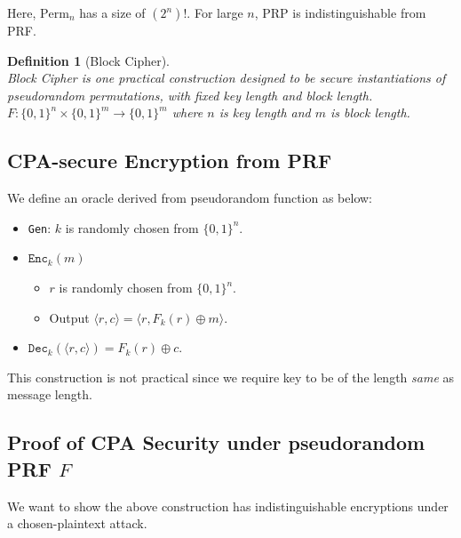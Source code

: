 \documentclass[12pt]{article}
\newtheorem{definition}{Definition}[section]
\theoremstyle{definition}
\begin{document}
Here, $\text{Perm}_n$ has a size of $(2^n)!$. For large $n$, PRP is indistinguishable from PRF.
\begin{definition}[Block Cipher]
\hfill\\\normalfont Block Cipher is one practical construction designed to be secure instantiations of pseudorandom permutations, with fixed key length and block length.
$
F:\{0,1\}^n\times \{0,1\}^m\to \{0,1\}^m
$
where $n$ is key length and $m$ is block length.
\end{definition}
\subsection{CPA-secure Encryption from PRF}
We define an oracle derived from pseudorandom function as below:
\begin{itemize}
  \item \texttt{Gen}: $k$ is randomly chosen from $\{0,1\}^n$.
  \item $\texttt{Enc}_k(m)$
  \begin{itemize}
    \item $r$ is randomly chosen from $\{0,1\}^n$.
    \item Output $\langle r,c\rangle = \langle r, F_k(r)\oplus m\rangle$.
  \end{itemize}
  \item $\texttt{Dec}_k(\langle r, c\rangle) = F_k(r)\oplus c$.
\end{itemize}
This construction is not practical since we require key to be of the length \textit{same} as message length.
\subsection{Proof of CPA Security under pseudorandom PRF {$F$}}
We want to show the above construction has indistinguishable encryptions under a chosen-plaintext attack.
\end{document}
